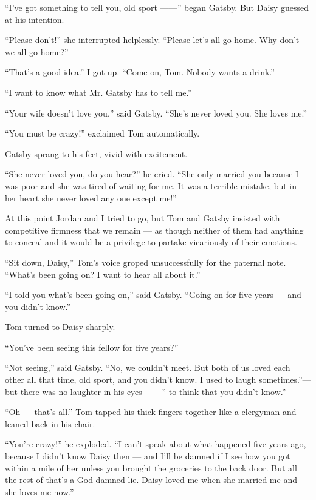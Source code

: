 \documentclass{znotebook}
\begin{document}
``I've got something to tell you, old sport ——'' began Gatsby. But Daisy guessed at his intention.

``Please don't!'' she interrupted helplessly. ``Please let's all go home. Why don't we all go home?''

``That's a good idea.'' I got up. ``Come on, Tom. Nobody wants a drink.''

``I want to know what Mr. Gatsby has to tell me.''

``Your wife doesn't love you,'' said Gatsby. ``She's never loved you. She loves me.''

``You must be crazy!'' exclaimed Tom automatically.

Gatsby sprang to his feet, vivid with excitement.

``She never loved you, do you hear?'' he cried. ``She only married you because I was poor and she was tired of waiting for me. It was a terrible mistake, but in her heart she never loved any one except me!''

At this point Jordan and I tried to go, but Tom and Gatsby insisted with competitive firmness that we remain — as though neither of them had anything to conceal and it would be a privilege to partake vicariously of their emotions.

``Sit down, Daisy,'' Tom's voice groped unsuccessfully for the paternal note. ``What's been going on? I want to hear all about it.''

``I told you what's been going on,'' said Gatsby. ``Going on for five years — and you didn't know.''

Tom turned to Daisy sharply.

``You've been seeing this fellow for five years?''

``Not seeing,'' said Gatsby. ``No, we couldn't meet. But both of us loved each other all that time, old sport, and you didn't know. I used to laugh sometimes.''— but there was no laughter in his eyes ——'' to think that you didn't know.''

``Oh — that's all.'' Tom tapped his thick fingers together like a clergyman and leaned back in his chair.

``You're crazy!'' he exploded. ``I can't speak about what happened five years ago, because I didn't know Daisy then — and I'll be damned if I see how you got within a mile of her unless you brought the groceries to the back door. But all the rest of that's a God damned lie. Daisy loved me when she married me and she loves me now.''
\end{document}
